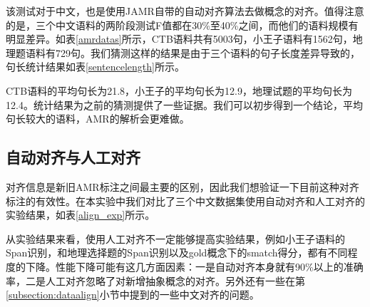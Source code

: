 \documentclass[master, winfont]{njuthesis}
\begin{document}
该测试对于中文，也是使用JAMR自带的自动对齐算法去做概念的对齐。值得注意的是，三个中文语料的两阶段测试F值都在30\%至40\%之间，而他们的语料规模有明显差异。如表\ref{amrdatas}所示，CTB语料共有5003句，小王子语料有1562句，地理题语料有729句。我们猜测这样的结果是由于三个语料的句子长度差异导致的，句长统计结果如表\ref{sentencelength}所示。

CTB语料的平均句长为21.8，小王子的平均句长为12.9，地理试题的平均句长为12.4。统计结果为之前的猜测提供了一些证据。我们可以初步得到一个结论，平均句长较大的语料，AMR的解析会更难做。

\subsection{自动对齐与人工对齐}
对齐信息是新旧AMR标注之间最主要的区别，因此我们想验证一下目前这种对齐标注的有效性。在本实验中我们对比了三个中文数据集使用自动对齐和人工对齐的实验结果，如表\ref{align_exp}所示。

从实验结果来看，使用人工对齐不一定能够提高实验结果，例如小王子语料的Span识别，和地理选择题的Span识别以及gold概念下的smatch得分，都有不同程度的下降。性能下降可能有这几方面因素：一是自动对齐本身就有90\%以上的准确率，二是人工对齐忽略了对新增抽象概念的对齐。另外还有一些在第\ref{subsection:dataalign}小节中提到的一些中文对齐的问题。

\begin{center}
\begin{table}[!htbp]
\caption{\label{align_exp} 中文AMR对齐方式的影响}
\end{table}
\end{center}
\end{document}
